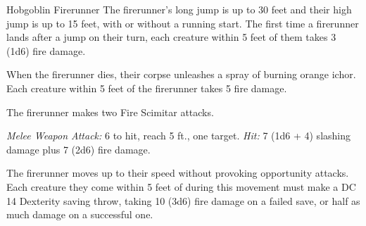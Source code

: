 \documentclass[10pt,a4paper,twoside,bg=print,twocolumn,openany,nodeprecatedcode]{dndbook}
\begin{document}
\begin{DndMonster}[float=t]{Hobgoblin Firerunner}
\DndMonsterBasics[
armor-class = {16 (studded leather armor)},
hit-points = {\DndDice{12d8 + 24}},
speed = {40 ft.}
]
\DndMonsterAbilityScores[
 str = 15,
 dex = 18,
 con = 14,
 int = 11,
 wis = 12,
 cha = 10
]
\DndMonsterDetails[
saving-throws = {Dex +6},
skills = {Acrobatics +6},
damage-immunities = {fire},
senses = {darkvision 60 ft., passive perception 11},
languages = {Common, Goblin, Infernal},
challenge = 4,
]
The firerunner's long jump is up to 30 feet and their high jump is up to 15 feet, with or without a running start. The first time a firerunner lands after a jump on their turn, each creature within 5 feet of them takes 3 (1d6) fire damage.

When the firerunner dies, their corpse unleashes a spray of burning orange ichor. Each creature within 5 feet of the firerunner takes 5 fire damage.

The firerunner makes two Fire Scimitar attacks.

\textsl{Melee Weapon Attack:} 6 to hit, reach 5 ft., one target. \textsl{Hit:} 7 (1d6 + 4) slashing damage plus 7 (2d6) fire damage.

The firerunner moves up to their speed without provoking opportunity attacks. Each creature they come within 5 feet of during this movement must make a DC 14 Dexterity saving throw, taking 10 (3d6) fire damage on a failed save, or half as much damage on a successful one.

\end{DndMonster}
\end{document}
